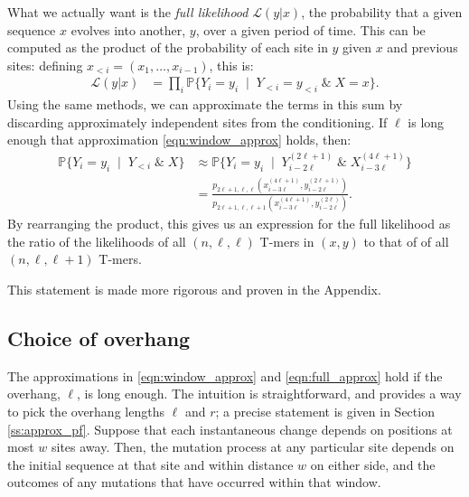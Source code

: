 \documentclass{article}
\renewcommand{\P}{\mathbb{P}}
\newcommand{\calS}{\mathcal{S}}  %
\newcommand{\given}{\;\mid\;}
\newcommand{\like}{\mathcal L}
\theoremstyle{plain}
\theoremstyle{definition}
\begin{document}
What we actually want is the \emph{full likelihood} $\like(y|x)$,
the probability that a given sequence $x$ evolves into another, $y$, over a given period of time.
This can be computed as the product of the probability of each site in $y$ given $x$ and previous sites:
defining $x_{<i}=(x_1, \ldots, x_{i-1})$, this is:
\begin{align*}
    \like(y|x) &= \prod_i \P\{ Y_i = y_i \given Y_{<i} = y_{<i} \;\&\; X=x \} .
\end{align*}
Using the same methods, we can approximate the terms in this sum
by discarding approximately independent sites from the conditioning.
If $\ell$ is long enough that approximation \eqref{eqn:window_approx} holds, then:
\begin{align} \label{eqn:full_approx}
    \P\{ Y_i = y_i \given Y_{<i} \;\&\; X \}
    &\approx
        \P\{ Y_i = y_i \given Y_{i-2\ell}^{(2\ell+1)} \;\&\; X_{i-3\ell}^{(4\ell+1)} \}  \\
    &=
        \frac{
            p_{2\ell+1,\ell,\ell}(x_{i-3\ell}^{(4\ell+1)}, y_{i-2\ell}^{(2\ell+1)})
        }{
            p_{2\ell+1,\ell,\ell+1}(x_{i-3\ell}^{(4\ell+1)}, y_{i-2\ell}^{(2\ell)})
        } .
\end{align}
By rearranging the product,
this gives us an expression for the full likelihood as the ratio of the likelihoods of all $(n,\ell,\ell)$ T-mers in $(x,y)$
to that of of all $(n,\ell,\ell+1)$ T-mers.

This statement is made more rigorous and proven in the Appendix.

\subsection{Choice of overhang}

The approximations in \eqref{eqn:window_approx} and \eqref{eqn:full_approx} hold if the overhang, $\ell$, is long enough.
The intuition is straightforward, and provides a way to pick the overhang lengths $\ell$ and $r$;
a precise statement is given in Section \ref{ss:approx_pf}.
Suppose that each instantaneous change depends on positions at most $w$ sites away.
Then, the mutation process at any particular site
depends on the initial sequence at that site and within distance $w$ on either side,
and the outcomes of any mutations that have occurred within that window.
\end{document}
